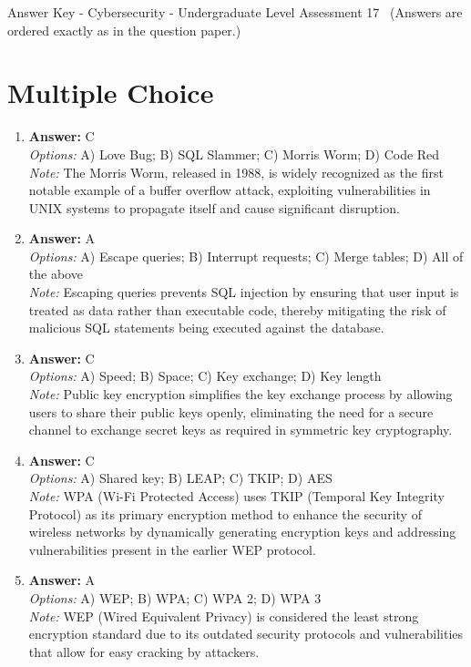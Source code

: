\documentclass[12pt]{article}
\begin{document}
\begin{center}
Answer Key - Cybersecurity - Undergraduate Level Assessment 17 \
\small (Answers are ordered exactly as in the question paper.)
\end{center}

\section*{Multiple Choice}
\begin{enumerate}[label=\arabic*.]
\item \textbf{Answer:} C
\\ \textit{Options:} A) Love Bug; B) SQL Slammer; C) Morris Worm; D) Code Red
\\ \textit{Note:} The Morris Worm, released in 1988, is widely recognized as the first notable example of a buffer overflow attack, exploiting vulnerabilities in UNIX systems to propagate itself and cause significant disruption.
\item \textbf{Answer:} A
\\ \textit{Options:} A) Escape queries; B) Interrupt requests; C) Merge tables; D) All of the above
\\ \textit{Note:} Escaping queries prevents SQL injection by ensuring that user input is treated as data rather than executable code, thereby mitigating the risk of malicious SQL statements being executed against the database.
\item \textbf{Answer:} C
\\ \textit{Options:} A) Speed; B) Space; C) Key exchange; D) Key length
\\ \textit{Note:} Public key encryption simplifies the key exchange process by allowing users to share their public keys openly, eliminating the need for a secure channel to exchange secret keys as required in symmetric key cryptography.
\item \textbf{Answer:} C
\\ \textit{Options:} A) Shared key; B) LEAP; C) TKIP; D) AES
\\ \textit{Note:} WPA (Wi-Fi Protected Access) uses TKIP (Temporal Key Integrity Protocol) as its primary encryption method to enhance the security of wireless networks by dynamically generating encryption keys and addressing vulnerabilities present in the earlier WEP protocol.
\item \textbf{Answer:} A
\\ \textit{Options:} A) WEP; B) WPA; C) WPA 2; D) WPA 3
\\ \textit{Note:} WEP (Wired Equivalent Privacy) is considered the least strong encryption standard due to its outdated security protocols and vulnerabilities that allow for easy cracking by attackers.
\end{enumerate}
\end{document}
